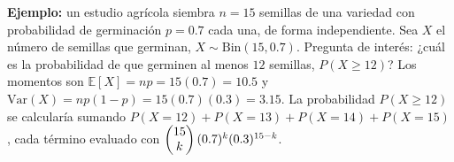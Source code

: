 \begin{solproblema}[prob:3c14103]
	\textbf{Ejemplo:} un estudio agrícola siembra $n=15$ semillas de una variedad con probabilidad de germinación $p=0.7$ cada una, de forma independiente. Sea $X$ el número de semillas que germinan, $X \sim \text{Bin}(15, 0.7)$. Pregunta de interés: ¿cuál es la probabilidad de que germinen al menos $12$ semillas, $P(X \ge 12)$? Los momentos son $\mathbb{E}[X] = np = 15(0.7) = 10.5$ y $\text{Var}(X) = np(1-p) = 15(0.7)(0.3) = 3.15$. La probabilidad $P(X\ge12)$ se calcularía sumando $P(X=12)+P(X=13)+P(X=14)+P(X=15)$, cada término evaluado con $\begin{pmatrix} 15 \\ k\end{pmatrix}(0.7)^k(0.3)^{15-k}$.
\end{solproblema}
